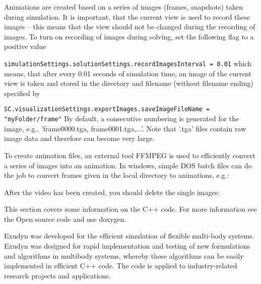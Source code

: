 Animations are created based on a series of images (frames, snapshots) taken during simulation. It is important, that the current view is used to record these images -- this means that the view should not be changed during the recording of images.
To turn on recording of images during solving, set the following flag to a positive value
\bi
  \item \texttt{simulationSettings.solutionSettings.recordImagesInterval = 0.01}
\ei
which means, that after every 0.01 seconds of simulation time, an image of the current view is taken and stored in the directory and filename (without filename ending) specified by 
\bi
  \item \texttt{SC.visualizationSettings.exportImages.saveImageFileName = "myFolder/frame"}
\ei
By default, a consecutive numbering is generated for the image, e.g., 'frame0000.tga, frame0001.tga,...'. Note that '.tga' files contain raw image data and therefore can become very large.

To create animation files, an external tool FFMPEG is used to efficiently convert a series of images into an animation.
In windows, simple DOS batch files can do the job to convert frames given in the local directory to animations, e.g.:
\plainlststyle

After the video has been created, you should delete the single images:
\plainlststyle




This section covers some information on the C++ code. For more information see the Open source code and use doxygen.

Exudyn was developed for the efficient simulation of flexible multi-body systems. Exudyn was designed for rapid implementation and testing of new formulations and algorithms in multibody systems, whereby these algorithms can be easily implemented in efficient C++ code. The code is applied to industry-related research projects and applications.

